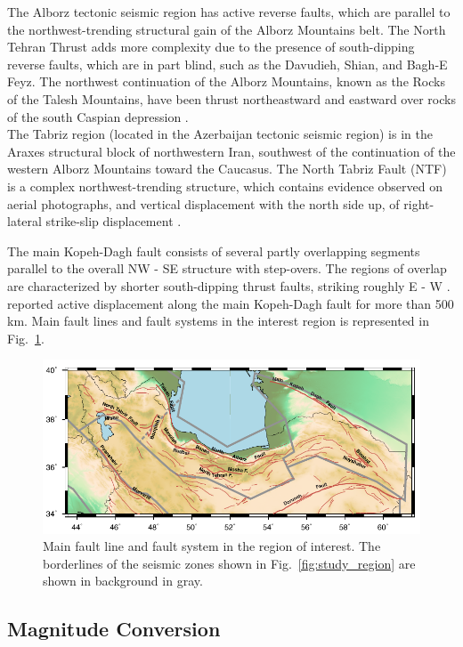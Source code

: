 The Alborz tectonic seismic region has active reverse faults, which are parallel to the northwest-trending structural gain of the Alborz Mountains belt. The North Tehran Thrust adds more complexity due to the presence of south-dipping reverse faults, which are in part blind, such as the Davudieh, Shian, and Bagh-E Feyz. The northwest continuation of the Alborz Mountains, known as the Rocks of the Talesh Mountains, have been thrust northeastward and eastward over rocks of the south Caspian depression  \citep{Berberian1999}.\\ 
The Tabriz region (located in the Azerbaijan tectonic seismic region) is in the Araxes structural block of northwestern Iran, southwest of the continuation of the western Alborz Mountains toward the Caucasus. The North Tabriz Fault (NTF) is a complex northwest-trending structure, which contains evidence observed on aerial photographs, and vertical displacement with the north side up, of right-lateral strike-slip displacement  \citep{Berberian1999}.

The main Kopeh-Dagh fault consists of several partly overlapping segments parallel to the overall  NW - SE  structure with step-overs. The regions of overlap are characterized by shorter south-dipping thrust faults, striking roughly E - W  \citep{Berberian2001}.  \citet{Trifonov1978} reported active displacement along the main Kopeh-Dagh fault for more than 500 km. Main fault lines and fault systems in the interest region is represented in Fig.~\ref{fig:faults}.

\begin{figure}[t]
\centering
\includegraphics[scale=1]{figures/pdf/Figure03.pdf} 
\caption{Main fault line and fault system in the region of interest. The borderlines of the seismic zones shown in Fig.~\ref{fig:study_region} are shown in background in gray.}
\label{fig:faults}
\end{figure}

\subsection{Magnitude Conversion}


